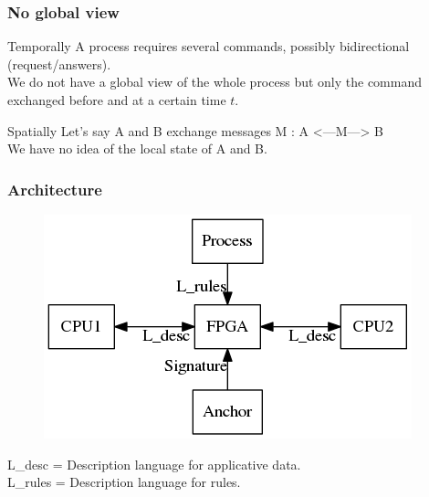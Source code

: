 \documentclass{beamer}
\begin{document}
\begin{frame}
    \frametitle{No global view}

    \begin{block}{Temporally}
        A process requires several commands, possibly bidirectional (request/answers).\\
        \medskip
        We do not have a global view of the whole process but only the command exchanged before and at a certain time $t$.
    \end{block}
    \vfill
    \begin{block}{Spatially}
        Let's say A and B exchange messages M : A <---M---> B\\
        We have no idea of the local state of A and B.
    \end{block}
\end{frame}

\begin{frame}
    \frametitle{Architecture}

    \begin{figure}[htb]
        \centering
        \includegraphics[scale=.35]{archi}
    \end{figure}
    \vfill
    L\_desc = Description language for applicative data.\\
    \medskip
    L\_rules = Description language for rules.
\end{frame}
\end{document}
